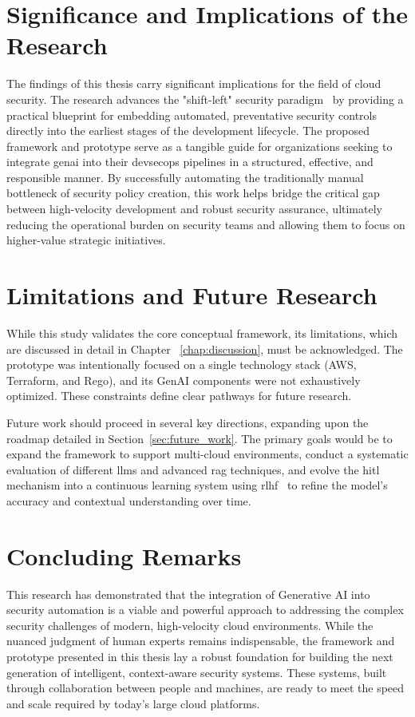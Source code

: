 \section{Significance and Implications of the Research}

The findings of this thesis carry significant implications for the field of cloud security. The research advances the "shift-left" security paradigm~\cite{akto_shift_2025} by providing a practical blueprint for embedding automated, preventative security controls directly into the earliest stages of the development lifecycle. The proposed framework and prototype serve as a tangible guide for organizations seeking to integrate \gls{genai} into their \gls{devsecops} pipelines in a structured, effective, and responsible manner. By successfully automating the traditionally manual bottleneck of security policy creation, this work helps bridge the critical gap between high-velocity development and robust security assurance, ultimately reducing the operational burden on security teams and allowing them to focus on higher-value strategic initiatives.

\section{Limitations and Future Research}

While this study validates the core conceptual framework, its limitations, which are discussed in detail in Chapter~
\ref{chap:discussion}, must be acknowledged. The prototype was intentionally focused on a single technology stack (AWS, Terraform, and Rego), and its GenAI components were not exhaustively optimized. These constraints define clear pathways for future research.

Future work should proceed in several key directions, expanding upon the roadmap detailed in Section~\ref{sec:future_work}. The primary goals would be to expand the framework to support multi-cloud environments, conduct a systematic evaluation of different \glspl{llm} and advanced \gls{rag} techniques, and evolve the \gls{hitl} mechanism into a continuous learning system using \gls{rlhf}~\cite{ouyang_training_2022} to refine the model's accuracy and contextual understanding over time.

\section{Concluding Remarks}

This research has demonstrated that the integration of Generative AI into security automation is a viable and powerful approach to addressing the complex security challenges of modern, high-velocity cloud environments. While the nuanced judgment of human experts remains indispensable, the framework and prototype presented in this thesis lay a robust foundation for building the next generation of intelligent, context-aware security systems. These systems, built through collaboration between people and machines, are ready to meet the speed and scale required by today’s large cloud platforms.